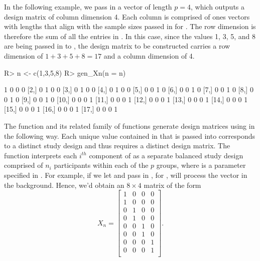 In the following example, we pass in a vector
of length $p = 4$, which outputs a design matrix of 
column dimension 4. Each column is comprised 
of ones vectors with lengths 
that align with the sample sizes passed in for
. The row dimension is therefore the sum 
of all the entries in . 
In this case, since the values 1, 3, 5, and 8 are
being passed in to , the design matrix
to be constructed carries a row dimension of 
$1 + 3 + 5 + 8 = 17$ and a column dimension of 4. 

\begin{Schunk}
\begin{Sin}
R> n <- c(1,3,5,8)
R> gen_Xn(n = n)
\end{Sin}
\begin{Sout}
      [,1] [,2] [,3] [,4]
 [1,]    1    0    0    0
 [2,]    0    1    0    0
 [3,]    0    1    0    0
 [4,]    0    1    0    0
 [5,]    0    0    1    0
 [6,]    0    0    1    0
 [7,]    0    0    1    0
 [8,]    0    0    1    0
 [9,]    0    0    1    0
[10,]    0    0    0    1
[11,]    0    0    0    1
[12,]    0    0    0    1
[13,]    0    0    0    1
[14,]    0    0    0    1
[15,]    0    0    0    1
[16,]    0    0    0    1
[17,]    0    0    0    1
\end{Sout}
\end{Schunk}

The  function and its related family of 
functions generate design matrices using  
in the following way. 
Each unique value contained in  that is
passed into  corresponds to a distinct
study design and thus requires a distinct
design matrix. The  function interprets each 
$i^{th}$ component of  as a separate balanced study 
design comprised of $n_i$ participants within each of the $p$
groups, where  is a parameter specified
in . For example, if we let 
 and pass in 
,  for ,  
 will process the vector
 in the background. Hence, we'd obtain an 
$8 \times 4$ matrix of the form
\[
X_n = 
\begin{bmatrix}
1 & 0 & 0 & 0 \\
1 & 0 & 0 & 0 \\
0 & 1 & 0 & 0 \\
0 & 1 & 0 & 0 \\
0 & 0 & 1 & 0 \\
0 & 0 & 1 & 0 \\
0 & 0 & 0 & 1 \\
0 & 0 & 0 & 1 \\
\end{bmatrix}.
\]



